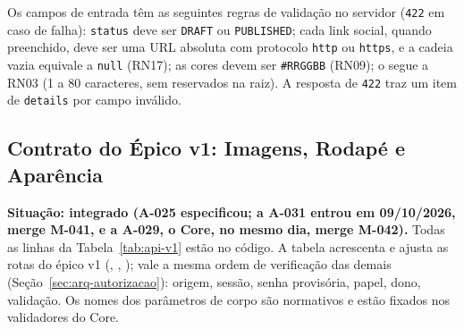 Os campos de entrada têm as seguintes regras de validação no servidor (\texttt{422} em caso de falha): \texttt{status} deve ser \texttt{DRAFT} ou \texttt{PUBLISHED}; cada link social, quando preenchido, deve ser uma URL absoluta com protocolo \texttt{http} ou \texttt{https}, e a cadeia vazia equivale a \texttt{null} (RN17); as cores devem ser \texttt{\#RRGGBB} (RN09); o  segue a RN03 (1 a 80 caracteres, sem  reservados na raiz). A resposta de \texttt{422} traz um item de \texttt{details} por campo inválido.

\subsection{Contrato do Épico v1: Imagens, Rodapé e Aparência}\label{sec:arq-api-v1}

\textbf{Situação: integrado (A-025 especificou; a A-031 entrou em 09/10/2026, merge M-041, e a A-029, o Core, no mesmo dia, merge M-042).} Todas as linhas da Tabela~\ref{tab:api-v1} estão no código. A tabela acrescenta e ajusta as rotas do épico v1 (, , ); vale a mesma ordem de verificação das demais (Seção~\ref{sec:arq-autorizacao}): origem, sessão, senha provisória, papel, dono, validação. Os nomes dos parâmetros de corpo são normativos e estão fixados nos validadores do Core.

